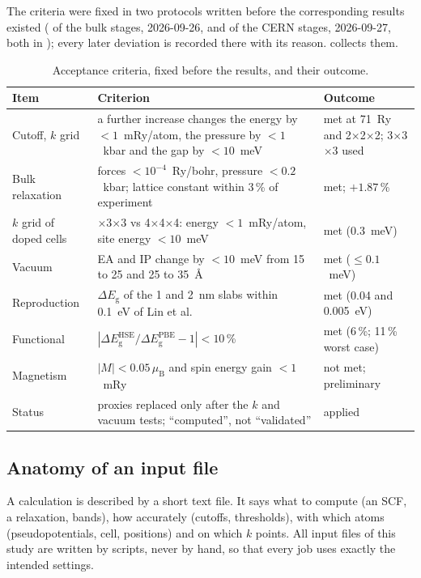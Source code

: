 The criteria were fixed in two protocols written before the corresponding results existed
( of the bulk stages, 2026-09-26, and  of the CERN stages,
2026-09-27, both in ); every later deviation is recorded there with its reason.  collects them.

\begin{table}[htbp]\centering\footnotesize
\caption{Acceptance criteria, fixed before the results, and their outcome.}
\label{tab:dft-criteria}
\begin{tabularx}{\linewidth}{@{}>{\raggedright\arraybackslash}p{3.0cm}>{\raggedright\arraybackslash}X>{\raggedright\arraybackslash}p{3.2cm}@{}}
\toprule
Item & Criterion & Outcome \\
\midrule
Cutoff, $k$ grid & a further increase changes the energy by $<1$~mRy/atom, the pressure by $<1$~kbar and the gap by $<10$~meV & met at 71~Ry and 2$\times$2$\times$2; 3$\times$3$\times$3 used \\
Bulk relaxation & forces $<10^{-4}$~Ry/bohr, pressure $<0.2$~kbar; lattice constant within 3\,\% of experiment & met; $+1.87$\,\% \\
$k$ grid of doped cells & 3$\times$3$\times$3 vs 4$\times$4$\times$4: energy $<1$~mRy/atom, site energy $<10$~meV & met (0.3~meV) \\
Vacuum & EA and IP change by $<10$~meV from 15 to 25 and 25 to 35~\AA & met ($\le0.1$~meV) \\
Reproduction & $\Delta E_{\mathrm{g}}$ of the 1 and 2~nm slabs within 0.1~eV of Lin et al. & met (0.04 and 0.005~eV) \\
Functional & $|\Delta E_{\mathrm{g}}^{\mathrm{HSE}}/\Delta E_{\mathrm{g}}^{\mathrm{PBE}} - 1| < 10$\,\% & met (6\,\%; 11\,\% worst case) \\
Magnetism & $|M| < 0.05\,\mu_{\mathrm{B}}$ and spin energy gain $<1$~mRy & not met; preliminary \\
Status & proxies replaced only after the $k$ and vacuum tests; ``computed'', not ``validated'' & applied \\
\bottomrule
\end{tabularx}
\end{table}

\subsection{Anatomy of an input file}
\label{sec:dft-input}

\begin{dftplain}
A calculation is described by a short text file. It says what to compute (an SCF, a relaxation, bands), how accurately
(cutoffs, thresholds), with which atoms (pseudopotentials, cell, positions) and on which $k$ points. All input files of
this study are written by scripts, never by hand, so that every job uses exactly the intended settings.
\end{dftplain}

